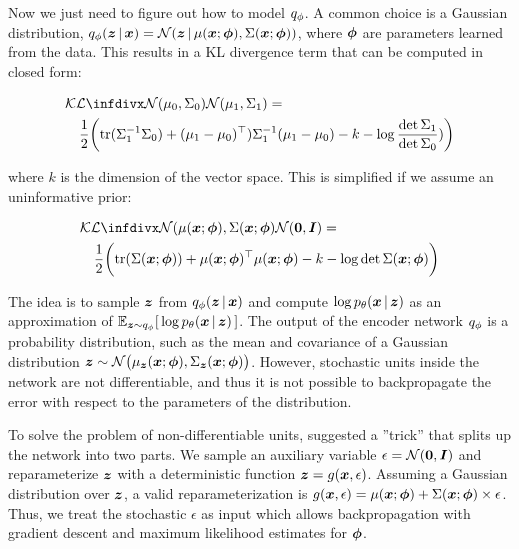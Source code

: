 Now we just need to figure out how to model $q_{\phi}$. A common choice is a Gaussian distribution, $\qphi \given{\vz}{\vx} = \mathcal{N}\given{\vz}{\mu (\vx;\vph), \Sigma(\vx; \vph)}$, where $\boldsymbol{\phi}$ are parameters learned from the data. This results in a KL divergence term that can be computed in closed form:

\begin{align}
\nonumber \lefteqn{\KL{\mathcal{N}(\mu_0, \Sigma_0)}{\mathcal{N}(\mu_1, \Sigma_1)} =} \\
& & \frac{1}{2} \bigg{(} \text{tr}(\Sigma_1^{-1}\Sigma_0) + (\mu_1 - \mu_0)^\top)\Sigma_1^{-1}(\mu_1 - \mu_0) - k - \log \frac{\det \Sigma_1}{\det \Sigma_0}) \bigg{)}
\label{kl-closed-form-eq1}
\end{align}

where $k$ is the dimension of the vector space. This is simplified if we assume an uninformative prior:

\begin{align}
\nonumber \lefteqn{ \KL{\mathcal{N}(\mu (\vx; \vph), \Sigma (\vx; \vph)}{ \mathcal{N}(\vec{0}, \vec{I})} =}\\
& & \frac{1}{2} \bigg{(} \text{tr}(\Sigma (\vx; \vph)) + \mu (\vx; \vph)^\top \mu (\vx; \vph) - k - \log{\det{\Sigma (\vx; \vph)}} \bigg{)}
\label{kl-closed-form-eq2}
\end{align}

The idea is to sample $\boldsymbol{z}$ from $\qphi \given{\vz}{\vx}$ and compute $\log{ p_\theta \given{\vx}{\vz}}$ as an approximation of $\E_{\vz \sim \qphi} [\,\log{\ptheta \given{\vx}{\vz}}\,]$. The output of the encoder network $q_{\phi}$ is a probability distribution, such as the mean and covariance of a Gaussian distribution $\boldsymbol{z} \sim \mathcal{N}\big(\mu_{\boldsymbol{z}} (\boldsymbol{x}; \boldsymbol{\phi}), \Sigma_{\boldsymbol{z}} (\boldsymbol{x}; \boldsymbol{\phi})\big)$. However, stochastic units inside the network are not differentiable, and thus it is not possible to backpropagate the error with respect to the parameters of the distribution.

To solve the problem of non-differentiable units, \parencite{kingma2013auto} suggested a ''trick'' that splits up the network into two parts. We sample an auxiliary variable $\epsilon = \mathcal{N}(\boldsymbol{0}, \boldsymbol{I})$ and reparameterize $\boldsymbol{z}$ with a deterministic function $\boldsymbol{z}=g(\boldsymbol{x}, \epsilon)$. Assuming a Gaussian distribution over $\boldsymbol{z}$, a valid reparameterization is $g(\boldsymbol{x}, \epsilon) = \mu(\boldsymbol{x}; \boldsymbol{\phi}) + \Sigma(\boldsymbol{x}; \boldsymbol{\phi}) \times \epsilon$.
Thus, we treat the stochastic $\epsilon$ as input which allows backpropagation with gradient descent and maximum likelihood estimates for $\boldsymbol{\phi}$.



